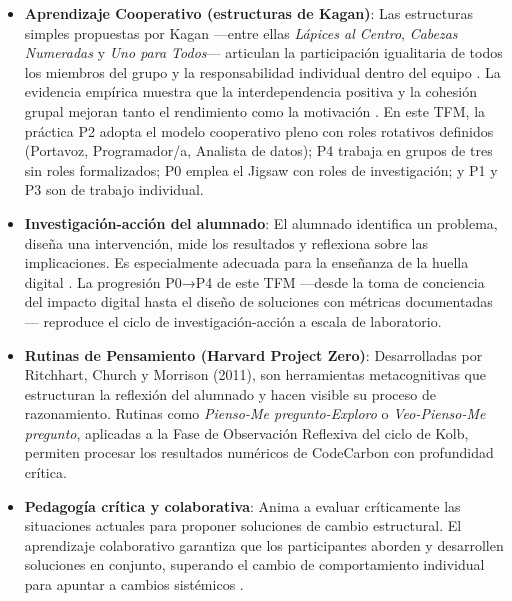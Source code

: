 \begin{itemize}
\item \textbf{Aprendizaje Cooperativo (estructuras de Kagan)}: Las estructuras simples propuestas por Kagan —entre ellas \textit{Lápices al Centro}, \textit{Cabezas Numeradas} y \textit{Uno para Todos}— articulan la participación igualitaria de todos los miembros del grupo y la responsabilidad individual dentro del equipo \cite{kagan2009cooperative}. La evidencia empírica muestra que la interdependencia positiva y la cohesión grupal mejoran tanto el rendimiento como la motivación \cite{johnson1999making}. En este TFM, la práctica P2 adopta el modelo cooperativo pleno con roles rotativos definidos (Portavoz, Programador/a, Analista de datos); P4 trabaja en grupos de tres sin roles formalizados; P0 emplea el Jigsaw con roles de investigación; y P1 y P3 son de trabajo individual.
\end{itemize}


\begin{itemize}
\item \textbf{Investigación-acción del alumnado}: El alumnado identifica un problema, diseña una intervención, mide los resultados y reflexiona sobre las implicaciones. Es especialmente adecuada para la enseñanza de la huella digital \cite{jensen1997action,junger2024potentials}. La progresión P0→P4 de este TFM —desde la toma de conciencia del impacto digital hasta el diseño de soluciones con métricas documentadas— reproduce el ciclo de investigación-acción a escala de laboratorio.
\end{itemize}


\begin{itemize}
\item \textbf{Rutinas de Pensamiento (Harvard Project Zero)}: Desarrolladas por Ritchhart, Church y Morrison (2011), son herramientas metacognitivas que estructuran la reflexión del alumnado y hacen visible su proceso de razonamiento. Rutinas como \textit{Pienso-Me pregunto-Exploro} o \textit{Veo-Pienso-Me pregunto}, aplicadas a la Fase de Observación Reflexiva del ciclo de Kolb, permiten procesar los resultados numéricos de CodeCarbon con profundidad crítica.
\end{itemize}


\begin{itemize}
\item \textbf{Pedagogía crítica y colaborativa}: Anima a evaluar críticamente las situaciones actuales para proponer soluciones de cambio estructural. El aprendizaje colaborativo garantiza que los participantes aborden y desarrollen soluciones en conjunto, superando el cambio de comportamiento individual para apuntar a cambios sistémicos \cite{unesco2025guia}.
\end{itemize}


